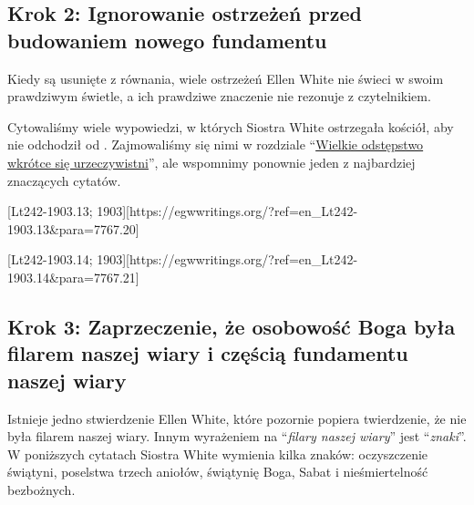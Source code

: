 \subsection*{Krok 2: Ignorowanie ostrzeżeń przed budowaniem nowego fundamentu}
Kiedy  są usunięte z równania, wiele ostrzeżeń Ellen White nie świeci w swoim prawdziwym świetle, a ich prawdziwe znaczenie nie rezonuje z czytelnikiem.

Cytowaliśmy wiele wypowiedzi, w których Siostra White ostrzegała kościół, aby nie odchodził od . Zajmowaliśmy się nimi w rozdziale “\hyperref[chap:apostasy]{Wielkie odstępstwo wkrótce się urzeczywistni}”, ale wspomnimy ponownie jeden z najbardziej znaczących cytatów.

[Lt242-1903.13; 1903][https://egwwritings.org/?ref=en\_Lt242-1903.13&para=7767.20]

[Lt242-1903.14; 1903][https://egwwritings.org/?ref=en\_Lt242-1903.14&para=7767.21]

\subsection*{Krok 3: Zaprzeczenie, że osobowość Boga była filarem naszej wiary i częścią fundamentu naszej wiary}

Istnieje jedno stwierdzenie Ellen White, które pozornie popiera twierdzenie, że  nie była filarem naszej wiary. Innym wyrażeniem na “\textit{filary naszej wiary}” jest “\textit{znaki}”. W poniższych cytatach Siostra White wymienia kilka znaków: oczyszczenie świątyni, poselstwa trzech aniołów, świątynię Boga, Sabat i nieśmiertelność bezbożnych.


